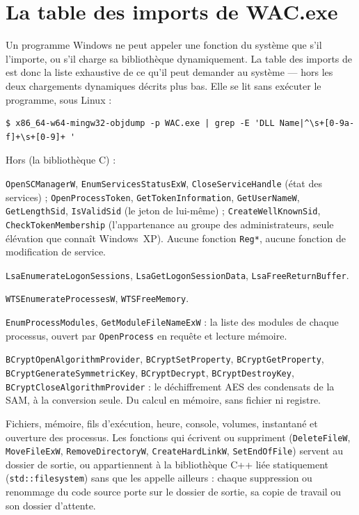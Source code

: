 \documentclass[11pt,a4paper,oneside]{report}
\begin{document}
\section{La table des imports de WAC.exe}

Un programme Windows ne peut appeler une fonction du système que s'il
l'importe, ou s'il charge sa bibliothèque dynamiquement. La table des imports
de  est donc la liste exhaustive de ce qu'il peut demander au
système — hors les deux chargements dynamiques décrits plus bas. Elle se lit
sans exécuter le programme, sous Linux :

\begin{lstlisting}
$ x86_64-w64-mingw32-objdump -p WAC.exe | grep -E 'DLL Name|^\s+[0-9a-f]+\s+[0-9]+ '
\end{lstlisting}

Hors  (la bibliothèque C) :

\begin{description}[style=nextline,leftmargin=1.2em]
  \item[ADVAPI32.dll] \texttt{OpenSCManagerW}, \texttt{EnumServicesStatusExW},
    \texttt{CloseServiceHandle} (état des services) ; \texttt{OpenProcessToken},
    \texttt{GetTokenInformation}, \texttt{GetUserNameW}, \texttt{GetLengthSid},
    \texttt{IsValidSid} (le jeton de \wac{} lui-même) ;
    \texttt{CreateWellKnownSid}, \texttt{CheckTokenMembership}
    (l'appartenance au groupe des administrateurs, seule
    élévation que connaît Windows~XP). Aucune fonction
    \texttt{Reg*}, aucune fonction de modification de service.
  \item[Secur32.dll] \texttt{LsaEnumerateLogonSessions},
    \texttt{LsaGetLogonSessionData}, \texttt{LsaFreeReturnBuffer}.
  \item[WTSAPI32.dll] \texttt{WTSEnumerateProcessesW},
    \texttt{WTSFreeMemory}.
  \item[PSAPI.DLL] \texttt{EnumProcessModules},
    \texttt{GetModuleFileNameExW} : la liste des modules de chaque processus,
    ouvert par \texttt{OpenProcess} en requête et lecture mémoire.
  \item[bcrypt.dll] \texttt{BCryptOpenAlgorithmProvider},
    \texttt{BCryptSetProperty}, \texttt{BCryptGetProperty}, \texttt{BCryptGenerateSymmetricKey},
    \texttt{BCryptDecrypt}, \texttt{BCryptDestroyKey},
    \texttt{BCryptCloseAlgorithmProvider} : le déchiffrement AES des condensats
    de la SAM, à la conversion seule. Du calcul en mémoire, sans fichier ni
    registre.
  \item[KERNEL32.dll] Fichiers, mémoire, fils d'exécution, heure, console,
    volumes, instantané et ouverture des processus. Les fonctions qui écrivent ou
    suppriment (\texttt{DeleteFileW}, \texttt{MoveFileExW},
    \texttt{RemoveDirectoryW}, \texttt{CreateHardLinkW}, \texttt{SetEndOfFile})
    servent au dossier de sortie, ou appartiennent à la bibliothèque C++ liée
    statiquement (\texttt{std::filesystem}) sans que \wac{} les appelle
    ailleurs : chaque suppression ou renommage du code source porte sur le
    dossier de sortie, sa copie de travail ou son dossier d'attente.
\end{description}
\end{document}
